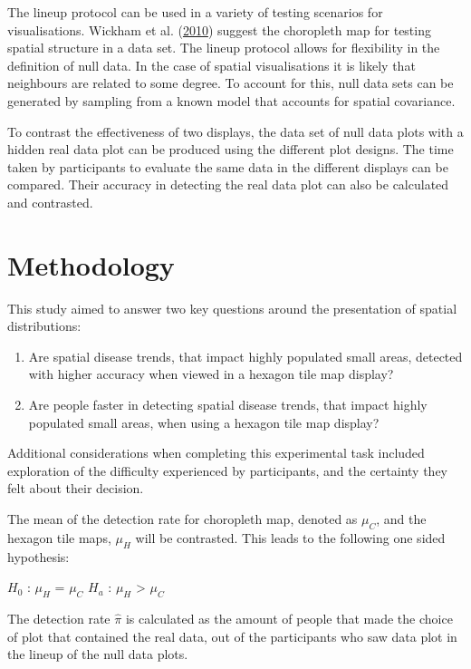\documentclass[conference,final,]{IEEEtran}
\begin{document}
The lineup protocol can be used in a variety of testing scenarios for
visualisations. Wickham et al. (\protect\hyperlink{ref-GIIV}{2010})
suggest the choropleth map for testing spatial structure in a data set.
The lineup protocol allows for flexibility in the definition of null
data. In the case of spatial visualisations it is likely that neighbours
are related to some degree. To account for this, null data sets can be
generated by sampling from a known model that accounts for spatial
covariance.

To contrast the effectiveness of two displays, the data set of null data
plots with a hidden real data plot can be produced using the different
plot designs. The time taken by participants to evaluate the same data
in the different displays can be compared. Their accuracy in detecting
the real data plot can also be calculated and contrasted.

\hypertarget{methodology}{%
\section{Methodology}\label{methodology}}

This study aimed to answer two key questions around the presentation of
spatial distributions:

\begin{enumerate}
\def\labelenumi{\arabic{enumi}.}
\item
  Are spatial disease trends, that impact highly populated small areas,
  detected with higher accuracy when viewed in a hexagon tile map
  display?
\item
  Are people faster in detecting spatial disease trends, that impact
  highly populated small areas, when using a hexagon tile map display?
\end{enumerate}

Additional considerations when completing this experimental task
included exploration of the difficulty experienced by participants, and
the certainty they felt about their decision.

The mean of the detection rate for choropleth map, denoted as \(\mu_C\),
and the hexagon tile maps, \(\mu_H\) will be contrasted. This leads to
the following one sided hypothesis:

\(H_0\) : \(\mu_H\) = \(\mu_C\) \(H_a\) : \(\mu_H\) \textgreater{}
\(\mu_C\)

The detection rate \(\hat\pi\) is calculated as the amount of people
that made the choice of plot that contained the real data, out of the
participants who saw data plot in the lineup of the null data plots.
\end{document}
